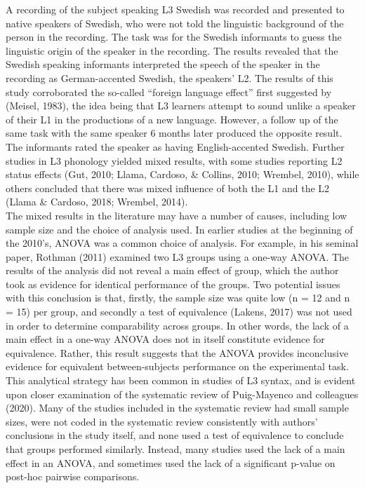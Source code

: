 \documentclass[
  english,
  man]{apa6}
\begin{document}
A recording of the subject speaking L3 Swedish was recorded and presented to native speakers of Swedish, who were not told the linguistic background of the person in the recording.
The task was for the Swedish informants to guess the linguistic origin of the speaker in the recording. The results revealed that the Swedish speaking informants interpreted the speech of the speaker in the recording as German-accented Swedish, the speakers' L2.
The results of this study corroborated the so-called ``foreign language effect'' first suggested by (Meisel, 1983), the idea being that L3 learners attempt to sound unlike a speaker of their L1 in the productions of a new language.
However, a follow up of the same task with the same speaker 6 months later produced the opposite result.
The informants rated the speaker as having English-accented Swedish. Further studies in L3 phonology yielded mixed results, with some studies reporting L2 status effects (Gut, 2010; Llama, Cardoso, \& Collins, 2010; Wrembel, 2010), while others concluded that there was mixed influence of both the L1 and the L2 (Llama \& Cardoso, 2018; Wrembel, 2014).\\
The mixed results in the literature may have a number of causes, including low sample size and the choice of analysis used.
In earlier studies at the beginning of the 2010's, ANOVA was a common choice of analysis.
For example, in his seminal paper, Rothman (2011) examined two L3 groups using a one-way ANOVA.
The results of the analysis did not reveal a main effect of group, which the author took as evidence for identical performance of the groups.
Two potential issues with this conclusion is that, firstly, the sample size was quite low (n = 12 and n = 15) per group, and secondly a test of equivalence (Lakens, 2017) was not used in order to determine comparability across groups.
In other words, the lack of a main effect in a one-way ANOVA does not in itself constitute evidence for equivalence.
Rather, this result suggests that the ANOVA provides inconclusive evidence for equivalent between-subjects performance on the experimental task.
This analytical strategy has been common in studies of L3 syntax, and is evident upon closer examination of the systematic review of Puig-Mayenco and colleagues (2020).
Many of the studies included in the systematic review had small sample sizes, were not coded in the systematic review consistently with authors' conclusions in the study itself, and none used a test of equivalence to conclude that groups performed similarly.
Instead, many studies used the lack of a main effect in an ANOVA, and sometimes used the lack of a significant p-value on post-hoc pairwise comparisons.
\end{document}
